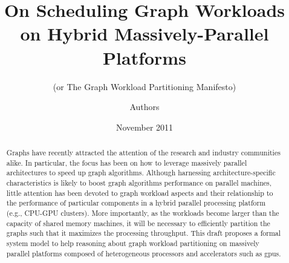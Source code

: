 \documentclass{acm_proc_article-sp}[10pt]
\title{On Scheduling Graph Workloads on Hybrid Massively-Parallel Platforms}
\subtitle{(or The Graph Workload Partitioning Manifesto)}
\author{
\alignauthor 
Authors
}
\date{November 2011}
\newcommand{\comment}[2]{\begin{center}\colorbox{#1}{\parbox{0.85\linewidth}{\textit{{#2}}}}\end{center}}
\newcommand{\abdullah}[1]{\comment{orange}{{Abdullah: #1}}}
\newcommand{\lauro}[1]{\comment{midblue}{{Lauro: #1}}}
\newcommand{\elizeu}[1]{\comment{lightgreen}{{Elizeu: #1}}}
\begin{document}
\maketitle


\begin{abstract}
Graphs have recently attracted the attention of the research and industry communities alike. In particular, the focus has been on how to leverage massively parallel architectures to speed up graph algorithms. Although harnessing architecture-specific characteristics is likely to boost graph algorithms performance on parallel machines, little attention has been devoted to graph workload aspects and their relationship to the performance of particular components in a hybrid parallel processing platform (e.g., CPU-GPU clusters). More importantly, as the workloads become larger than the capacity of shared memory machines, it will be necessary to efficiently partition the graphs such that it maximizes the processing throughput. This draft proposes a formal system model to help reasoning about graph workload partitioning on massively parallel platforms composed of heterogeneous processors and accelerators such as {\sc gpu}s.
\end{abstract}









\balancecolumns
\end{document}
